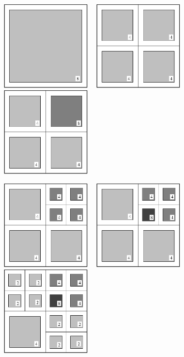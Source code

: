 \centerline{\includegraphics[width=1.8in]{amr2-1.eps} \ \
            \includegraphics[width=1.8in]{amr2-2.eps} \ \
            \includegraphics[width=1.8in]{amr2-3.eps}}

\centerline{\includegraphics[width=1.8in]{amr2-4.eps} \ \
            \includegraphics[width=1.8in]{amr2-5.eps} \ \
            \includegraphics[width=1.8in]{amr2-6.eps}}

